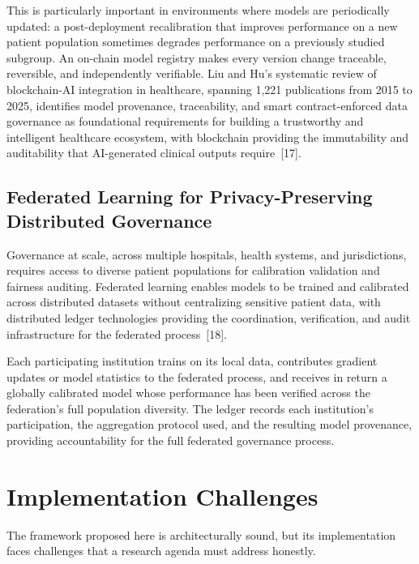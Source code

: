 This is particularly important in environments where models are
periodically updated: a post-deployment recalibration that improves
performance on a new patient population sometimes degrades performance
on a previously studied subgroup. An on-chain model registry makes every
version change traceable, reversible, and independently verifiable. Liu
and Hu's systematic review of blockchain-AI integration in healthcare,
spanning 1,221 publications from 2015 to 2025, identifies model
provenance, traceability, and smart contract-enforced data governance as
foundational requirements for building a trustworthy and intelligent
healthcare ecosystem, with blockchain providing the immutability and
auditability that AI-generated clinical outputs require~{[}17{]}.

\subsection{Federated Learning for Privacy-Preserving Distributed
Governance}\label{federated-learning-for-privacy-preserving-distributed-governance}

Governance at scale, across multiple hospitals, health systems, and
jurisdictions, requires access to diverse patient populations for
calibration validation and fairness auditing. Federated learning enables
models to be trained and calibrated across distributed datasets without
centralizing sensitive patient data, with distributed ledger
technologies providing the coordination, verification, and audit
infrastructure for the federated process~{[}18{]}.

Each participating institution trains on its local data, contributes
gradient updates or model statistics to the federated process, and
receives in return a globally calibrated model whose performance has
been verified across the federation's full population diversity. The
ledger records each institution's participation, the aggregation
protocol used, and the resulting model provenance, providing
accountability for the full federated governance process.


\section{Implementation Challenges}\label{implementation-challenges}

The framework proposed here is architecturally sound, but its
implementation faces challenges that a research agenda must address
honestly.

